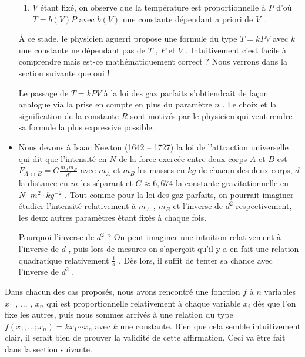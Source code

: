 \begin{itemize}[label=\small\textbullet]
\begin{enumerate}[label=(\alph*)]
		\item $V$ étant fixé, on observe que la température est proportionnelle à $P$ d'où $T = b(V) P$ avec $b(V)$ une constante dépendant a priori de $V$ .
	\end{enumerate}

	\noindent
	À ce stade, le physicien aguerri propose une formule du type $T = k P V$ avec $k$ une constante ne dépendant pas de $T$ , $P$ et $V$ .
	Intuitivement c'est facile à comprendre mais est-ce mathématiquement correct ? Nous verrons dans la section suivante que oui !
	
	\smallskip
	\noindent
	Le passage de $T = k P V$ à la loi des gaz parfaits s'obtiendrait de façon analogue via la prise en compte en plus du paramètre $n$ .
	Le choix et la signification de la constante $R$ sont motivés par le physicien qui veut rendre sa formule la plus expressive possible.




	\medskip
	\item Nous devons à Isaac Newton (1642 -- 1727) la loi de l'attraction universelle qui dit que l'intensité en $N$ de la force exercée entre deux corps $A$ et $B$ est $F_{A \leftrightarrow B} = G \frac{m_A m_B}{d^2}$ avec $m_A$ et $m_B$ les masses en $kg$ de chacun des deux corps, $d$ la distance en $m$ les séparant et $G \approx 6,674$ la constante gravitationnelle en $N \cdot m^2 \cdot kg^{-2}$ .
	Tout comme pour la loi des gaz parfaits, on pourrait imaginer étudier l'intensité relativement à $m_A$ , $m_B$ et l'inverse de $d^2$ respectivement, les deux autres paramètres étant fixés à chaque fois.
	
	\smallskip
	\noindent
	Pourquoi l'inverse de $d^2$ ? On peut imaginer une intuition relativement à l'inverse de $d$ , puis lors de mesures on s'aperçoit qu'il y a en fait une relation quadratique relativement $\frac{1}{d}$ . Dès lors, il suffit de tenter sa chance avec l'inverse de $d^2$ .
\end{itemize}




\medskip

Dans chacun des cas proposés, nous avons rencontré une fonction $f$ à $n$ variables $x_1$ , ... , $x_n$ qui est proportionnelle relativement à chaque variable $x_i$ dès que l'on fixe les autres,
puis nous sommes arrivés à une relation du type $f(x_1 ; ... ; x_n) = k x_1 \cdots x_n$ avec $k$ une constante. Bien que cela semble intuitivement clair, il serait bien de prouver la validité de cette affirmation. Ceci va être fait dans la section suivante.


